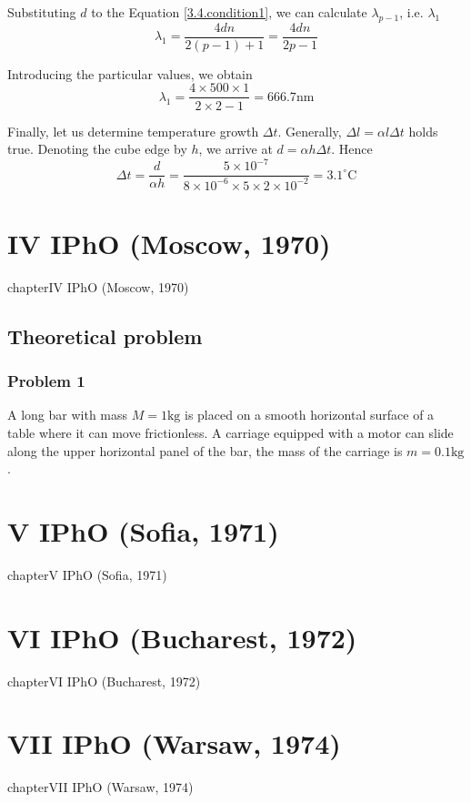 \documentclass[12pt,a4paper]{book}
\begin{document}
	Substituting $d$ to the Equation \ref{3.4.condition1}, we can calculate $\lambda_{p-1}$, i.e. $\lambda_1$
	\begin{equation*}
		\lambda_1=\frac{4dn}{2(p-1)+1}=\frac{4dn}{2p-1}
	\end{equation*}\par
	Introducing the particular values, we obtain
	\begin{equation*}
		\lambda_1=\frac{4\times500\times1}{2\times2-1}=666.7\text{nm}
	\end{equation*}\par
	Finally, let us determine temperature growth $\Delta t$. Generally, $\Delta l=\alpha l\Delta t$ holds true. Denoting the cube edge by $h$, we arrive at $d=\alpha h\Delta t$. Hence
	\begin{equation*}
		\Delta t=\frac{d}{\alpha h}=\frac{5\times10^{-7}}{8\times10^{-6}\times5\times2\times10^{-2}}=3.1^{\circ}\mathrm{C}
	\end{equation*}
\chapter*{IV IPhO (Moscow, 1970)}
{chapter}{IV IPhO (Moscow, 1970)}
\section*{Theoretical problem}
	\subsection*{Problem 1}
	A long bar with mass $M=1\text{kg}$ is placed on a smooth horizontal surface of a table where it can move frictionless. A carriage equipped with a motor can slide along the upper horizontal panel of the bar, the mass of the carriage is $m=0.1\text{kg}$.
\chapter*{V IPhO (Sof\mbox{}ia, 1971)}
{chapter}{V IPhO (Sof\mbox{}ia, 1971)}
\chapter*{VI IPhO (Bucharest, 1972)}
{chapter}{VI IPhO (Bucharest, 1972)}
\chapter*{VII IPhO (Warsaw, 1974)}
{chapter}{VII IPhO (Warsaw, 1974)}
\end{document}

